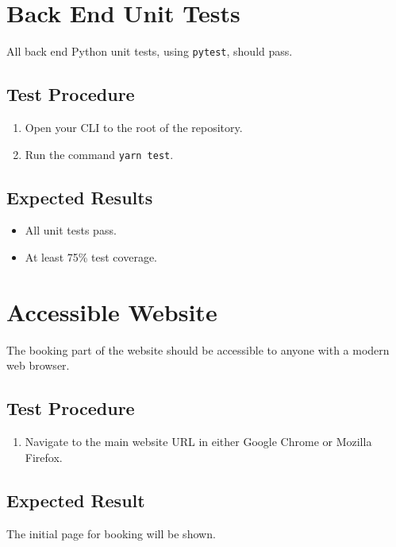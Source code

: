 \documentclass[a4paper, draft]{article}
\begin{document}
\section{Back End Unit Tests}
All back end Python unit tests, using \texttt{pytest}, should pass.

\subsection{Test Procedure}
\begin{enumerate}
    \item Open your CLI to the root of the repository.
    \item Run the command \texttt{yarn test}.
\end{enumerate}

\subsection{Expected Results}
\begin{itemize}
    \item All unit tests pass.
    \item At least 75\% test coverage.
\end{itemize}

\newpage
\section{Accessible Website}
The booking part of the website should be accessible to anyone with a modern web browser.

\subsection{Test Procedure}
\begin{enumerate}
    \item Navigate to the main website URL in either Google Chrome or Mozilla Firefox.
\end{enumerate}

\subsection{Expected Result}
The initial page for booking will be shown.
\end{document}
